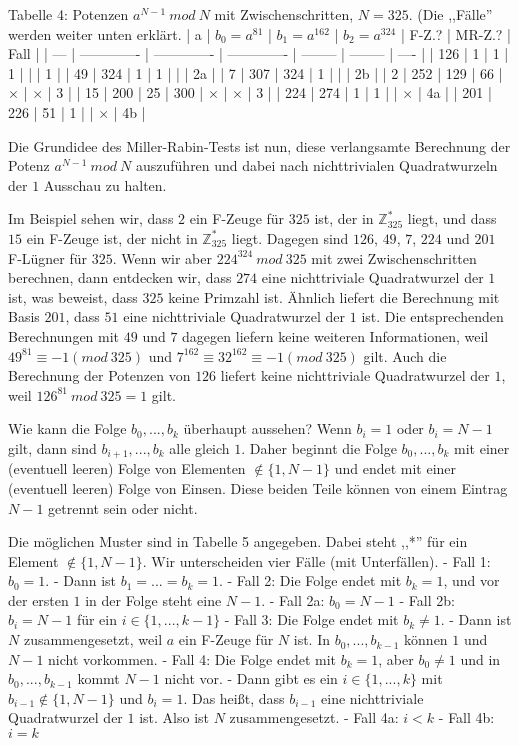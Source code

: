 \documentclass[a4paper]{article}
\begin{document}
\begin{multicols}{3}
Tabelle 4: Potenzen $a^{N-1}\ mod\ N$ mit Zwischenschritten, $N=325$. (Die ,,Fälle'' werden weiter unten erklärt.
| a   | $b_0 =a^{81}$ | $b_1=a^{162}$ | $b_2=a^{324}$ | F-Z.?    | MR-Z.?   | Fall |
| --- | ------------- | ------------- | ------------- | -------- | -------- | ---- |
| 126 | 1             | 1             | 1             |          |          | 1    |
| 49  | 324           | 1             | 1             |          |          | 2a   |
| 7   | 307           | 324           | 1             |          |          | 2b   |
| 2   | 252           | 129           | 66            | $\times$ | $\times$ | 3    |
| 15  | 200           | 25            | 300           | $\times$ | $\times$ | 3    |
| 224 | 274           | 1             | 1             |          | $\times$ | 4a   |
| 201 | 226           | 51            | 1             |          | $\times$ | 4b   |

Die Grundidee des Miller-Rabin-Tests ist nun, diese verlangsamte Berechnung der Potenz $a^{N-1}\ mod\ N$ auszuführen und dabei nach nichttrivialen Quadratwurzeln der $1$ Ausschau zu halten.

Im Beispiel sehen wir, dass $2$ ein F-Zeuge für $325$ ist, der in $\mathbb{Z}^*_{325}$ liegt, und dass $15$ ein F-Zeuge ist, der nicht in $\mathbb{Z}^*_{325}$ liegt. Dagegen sind $126$, $49$, $7$, $224$ und $201$ F-Lügner für $325$. Wenn wir aber $224^{324}\ mod\ 325$ mit zwei Zwischenschritten berechnen, dann entdecken wir, dass $274$ eine nichttriviale Quadratwurzel der $1$ ist, was beweist, dass $325$ keine Primzahl ist. Ähnlich liefert die Berechnung mit Basis $201$, dass $51$ eine nichttriviale Quadratwurzel der $1$ ist. Die entsprechenden Berechnungen mit $49$ und $7$ dagegen liefern keine weiteren Informationen, weil $49^{81} \equiv -1 (mod\ 325)$ und $7^{162} \equiv 32^{162} \equiv -1 (mod\ 325)$ gilt. Auch die Berechnung der Potenzen von $126$ liefert keine nichttriviale Quadratwurzel der $1$, weil $126^{81}\ mod\ 325 = 1$ gilt.

Wie kann die Folge $b_0,...,b_k$ überhaupt aussehen? Wenn $b_i=1$ oder $b_i=N-1$ gilt, dann sind $b_{i+1},...,b_k$ alle gleich $1$. Daher beginnt die Folge $b_0,...,b_k$ mit einer (eventuell leeren) Folge von Elementen $\not\in\{1,N-1\}$ und endet mit einer (eventuell leeren) Folge von Einsen. Diese beiden Teile können von einem Eintrag $N-1$ getrennt sein oder nicht.

Die möglichen Muster sind in Tabelle 5 angegeben. Dabei steht ,,*'' für ein Element $\not\in\{1,N-1\}$. Wir unterscheiden vier Fälle (mit Unterfällen).
- Fall 1: $b_0 = 1$. - Dann ist $b_1 =...=b_k= 1$.
- Fall 2: Die Folge endet mit $b_k= 1$, und vor der ersten $1$ in der Folge steht eine $N-1$. 
  - Fall 2a: $b_0 =N-1$
  - Fall 2b: $b_i=N-1$ für ein $i\in\{1,...,k-1\}$
- Fall 3: Die Folge endet mit $b_k\not= 1$. - Dann ist $N$ zusammengesetzt, weil $a$ ein F-Zeuge für $N$ ist. In $b_0,...,b_{k-1}$ können $1$ und $N-1$ nicht vorkommen.
- Fall 4: Die Folge endet mit $b_k=1$, aber $b_0\not= 1$ und in $b_0,...,b_{k-1}$ kommt $N-1$ nicht vor. - Dann gibt es ein $i\in\{1,...,k\}$ mit $b_{i-1}\not\in\{1,N-1\}$ und $b_i=1$. Das heißt, dass $b_{i-1}$ eine nichttriviale Quadratwurzel der $1$ ist. Also ist $N$ zusammengesetzt.
  - Fall 4a: $i<k$
  - Fall 4b: $i=k$


\end{multicols}
\end{document}
